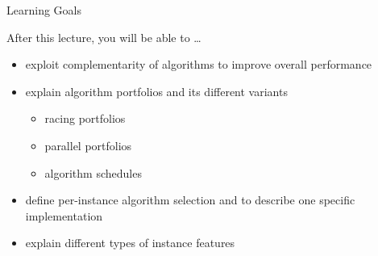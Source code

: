 \begin{frame}[c]{Learning Goals}

After this lecture, you will be able to \ldots

\begin{itemize}
  \item \alert{exploit complementarity} of algorithms to improve overall performance
  \item explain \alert{algorithm portfolios} and its different variants
  \begin{itemize}
    \item racing portfolios
    \item parallel portfolios
    \item algorithm schedules
  \end{itemize}
  \item define \alert{per-instance algorithm selection} and to describe one specific implementation 
  \item explain different types of \alert{instance features}
\end{itemize}

\end{frame}
